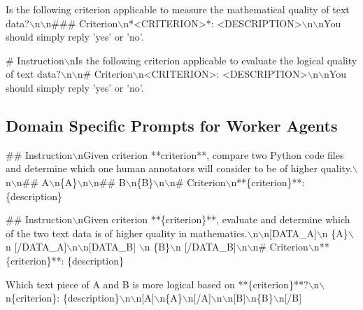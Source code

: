 \begin{tcolorbox}
    [title = {Retrieve Math Criteria},breakable] \footnotesize Is the following criterion
    applicable to measure the mathematical quality of text data?$\backslash$n$\backslash$n\#\#\#
    Criterion$\backslash$n*<CRITERION>*: <DESCRIPTION>$\backslash$n$\backslash$nYou
    should simply reply 'yes' or 'no'.
\end{tcolorbox}

\begin{tcolorbox}
    [title = {Retrieve Logic Criteria},breakable] \footnotesize \# Instruction$\backslash$nIs
    the following criterion applicable to evaluate the logical quality of text data?$\backslash$n$\backslash$n\#
    Criterion$\backslash$n<CRITERION>: <DESCRIPTION>$\backslash$n$\backslash$nYou
    should simply reply 'yes' or 'no'.
\end{tcolorbox}

\subsection{Domain Specific Prompts for Worker Agents}

\begin{tcolorbox}
    [title = {Pairwise Judgment for Code},breakable] \footnotesize \#\#
    Instruction$\backslash$nGiven criterion **{criterion}**, compare two Python code
    files and determine which one human annotators will consider to be of higher
    quality.$\backslash$n$\backslash$n\#\# A$\backslash$n\{A\}$\backslash$n$\backslash$n\#\#
    B$\backslash$n\{B\}$\backslash$n$\backslash$n\# Criterion$\backslash$n**\{criterion\}**:
    \{description\}
\end{tcolorbox}

\begin{tcolorbox}
    [title = {Pairwise Judgment for Math},breakable] \footnotesize \#\#
    Instruction$\backslash$nGiven criterion **\{criterion\}**, evaluate and determine
    which of the two text data is of higher quality in mathematics.$\backslash$n$\backslash$n[DATA\_A]$\backslash$n \{A\}$\backslash$n [/DATA\_A]$\backslash$n$\backslash$n[DATA\_B] $\backslash$n \{B\}$\backslash$n [/DATA\_B]$\backslash$n$\backslash$n\#
    Criterion$\backslash$n**\{criterion\}**: \{description\}
\end{tcolorbox}

\begin{tcolorbox}
    [title = {Pairwise Judgment for Logic},breakable] \footnotesize Which text piece
    of A and B is more logical based on **\{criterion\}**?$\backslash$n$\backslash$n\{criterion\}:
    \{description\}$\backslash$n$\backslash$n[A]$\backslash$n\{A\}$\backslash$n[/A]$\backslash$n$\backslash$n[B]$\backslash$n\{B\}$\backslash$n[/B]
\end{tcolorbox}

